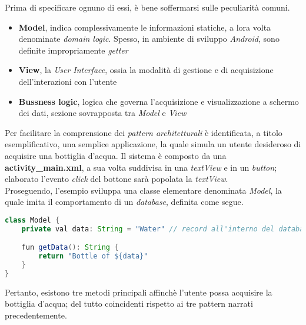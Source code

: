 \documentclass{article}
\begin{document}
Prima di specificare ognuno di essi, è bene soffermarsi sulle peculiarità comuni.
\begin{itemize}[label = {-}]
    \itemsep0em
    \item \textbf{Model}, indica complessivamente le informazioni statiche, a lora volta denominate \textit{domain logic}. Spesso, in ambiente di sviluppo \textit{Android}, sono definite impropriamente \textit{getter}
    \item \textbf{View}, la \textit{User Interface}, ossia la modalità di gestione e di acquisizione dell'interazioni con l'utente
    \item \textbf{Bussness logic}, logica che governa l'acquisizione e visualizzazione a schermo dei dati, sezione sovrapposta tra \textit{Model} e \textit{View}
\end{itemize}
Per facilitare la comprensione dei \textit{pattern architetturali} è identificata, a titolo esemplificativo, una semplice applicazione, la quale simula un utente desideroso di acquisire una bottiglia d'acqua. Il sistema è composto da una \textbf{activity\_main.xml}, a sua volta suddivisa in una \textit{textView} e in un \textit{button}; elaborato l'evento \textit{click} del bottone sarà popolata la \textit{textView}.\vspace*{7pt}\\
Proseguendo, l'esempio sviluppa una classe elementare denominata \textit{Model}, la quale imita il comportamento di un \textit{database}, definita come segue.
\begin{lstlisting}[language = JAVA]
class Model {
    private val data: String = "Water" // record all'interno del database fittizio

    fun getData(): String {
        return "Bottle of ${data}"
    }
}    
\end{lstlisting} 
Pertanto, esistono tre metodi principali affinchè l'utente possa acquisire la bottiglia d'acqua; del tutto coincidenti rispetto ai tre pattern narrati precedentemente.
\end{document}
